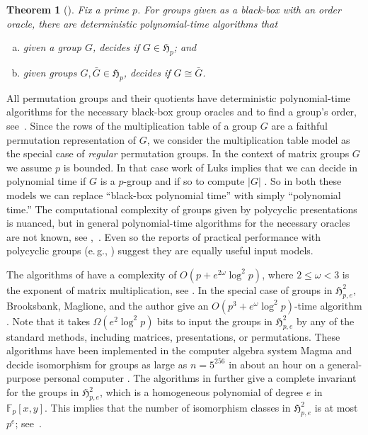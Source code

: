 \documentclass[11pt]{article}
\numberwithin{equation}{section}
\theoremstyle{definition}
\theoremstyle{plain}
\newcommand{\eg}{e.\,g.}
\numberwithin{equation}{section}
\theoremstyle{plain}       %
\newtheorem{thm}[equation]{Theorem}
\theoremstyle{remark}
\theoremstyle{definition}
\numberwithin{figure}{section}
\numberwithin{table}{section}
\newcommand{\mygroups}{\mathfrak{H}}
\newcommand{\bbF}{\mathbb{F}}  %
\begin{document}
\begin{thm}[\cite{LW}]\label{thm:algo}
Fix a prime $p$.  For groups given as a black-box with an order oracle, there are deterministic polynomial-time algorithms that
\begin{enumerate}[(a)]
\item given a group $G$, decides if $G\in\mygroups_p$; and 
\item given groups $G,\bar{G}\in \mygroups_p$, decides if $G\cong \bar{G}$.
\end{enumerate}
\end{thm}

All permutation groups and their quotients have deterministic polynomial-time
algorithms for the necessary black-box group oracles and to find a group's
order,
%
see~\cite[Chapter 3]{Seress}.    %
Since the rows of the multiplication table
of a group $G$ are a faithful permutation representation of $G$, 
we consider the
multiplication table model as the special case of \emph{regular} permutation
groups. In the context of matrix groups $G$ we assume $p$ is bounded.  In that
case work of Luks implies that we can decide in polynomial time if $G$ is a
$p$-group and if so to compute $|G|$ \cite{Luks:solv-mat}.  So in both these
models we can replace ``black-box polynomial time'' with simply ``polynomial
time.'' The computational complexity of groups given by polycyclic presentations
is nuanced, but in general polynomial-time algorithms for the necessary oracles
are not known, see \cite[Section~4]{collection},~\cite{deep-thought}. Even so
the reports of practical performance with polycyclic groups (\eg,
\cite[Section~7.2]{Seress}) suggest they are equally useful input models.

The algorithms of \cite{LW} have a complexity of $O(p+e^{2\omega}\log^2 p)$,
where $2\leq \omega<3$ is the exponent of matrix multiplication, see
\cite[Chapter~12]{vzG}. In the special case of groups in $\mygroups_{p,e}^{2}$,
Brooksbank, Maglione, and the author give an $O(p^3+e^{\omega}\log^2 p)$-time
algorithm \cite{BMW}.  Note that it takes $\Omega(e^2\log^2 p)$ bits to input
the groups in $\mygroups_{p,e}^{2}$ by any of the standard methods, including
matrices, presentations, or permutations.  These algorithms  have been
implemented in the computer algebra system \textsf{Magma} \cite{Magma} and
decide isomorphism for groups as large as $n=5^{256}$ in about an hour on a
general-purpose personal computer \cite[Figure~1.1]{BMW}. The algorithms in
\cite{BMW} further give a complete invariant for the groups in
$\mygroups_{p,e}^{2}$, which is a homogeneous polynomial of degree $e$ in
$\bbF_p[x,y]$.  This implies that the number of isomorphism classes in
$\mygroups_{p,e}^{2}$ is at most $p^{e}$; 
%
see~\cite[Proposition~9.2]{BMW}.    %
\medskip
\end{document}
